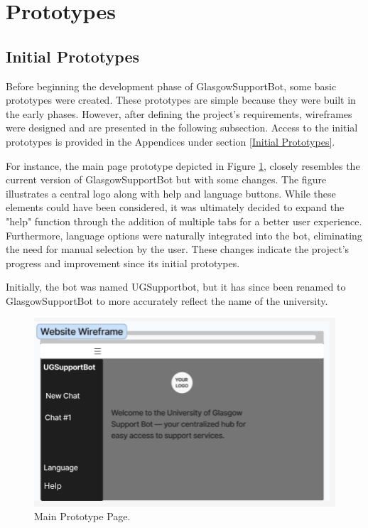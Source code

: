 \documentclass{l4proj}
\begin{document}
\section{Prototypes}

\subsection{Initial Prototypes}

Before beginning the development phase of GlasgowSupportBot, some basic prototypes were created. These prototypes are simple because they were built in the early phases. However, after defining the project's requirements, wireframes were designed and are presented in the following subsection. Access to the initial prototypes is provided in the Appendices under section \ref{Initial Prototypes}.


For instance, the main page prototype depicted in Figure \ref{fig:ProtoChatPage}, closely resembles the current version of GlasgowSupportBot but with some changes. The figure illustrates a central logo along with help and language buttons. While these elements could have been considered, it was ultimately decided to expand the "help" function through the addition of multiple tabs for a better user experience. Furthermore, language options were naturally integrated into the bot, eliminating the need for manual selection by the user. These changes indicate the project's progress and improvement since its initial prototypes.

Initially, the bot was named UGSupportbot, but it has since been renamed to GlasgowSupportBot to more accurately reflect the name of the university.

\begin{figure}[h!]
  \centering
  \begin{adjustbox}{center,max height=0.3\textheight, max width=\linewidth}
    \includegraphics{images/initial1.png}
  \end{adjustbox}
  \caption{Main Prototype Page.}
  \label{fig:ProtoChatPage}
\end{figure}
\end{document}
